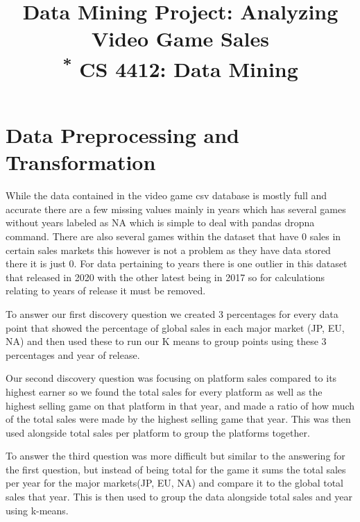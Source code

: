 \documentclass[conference]{IEEEtran}
\begin{document}
\title{Data Mining Project: Analyzing Video Game Sales\\
{\footnotesize \textsuperscript{*} CS 4412: Data Mining}

}

\author{

}
\maketitle
\section{Data Preprocessing and Transformation}
While the data contained in the video game csv database is mostly full and accurate there are a few missing values mainly in years which has several games without years labeled as NA which is simple to deal with pandas dropna command. There are also several games within the dataset that have 0 sales in certain sales markets this however is not a problem as they have data stored there it is just 0. For data pertaining to years there is one outlier in this dataset that released in 2020 with the other latest being in 2017 so for calculations relating to years of release it must be removed. 

To answer our first discovery question we created 3 percentages for every data point that showed the percentage of global sales in each major market (JP, EU, NA) and then used these to run our K means to group points using these 3 percentages and year of release.

Our second discovery question was focusing on platform sales compared to its highest earner so we found the total sales for every platform as well as the highest selling game on that platform in that year, and made a ratio of how much of the total sales were made by the highest selling game that year. This was then used alongside total sales per platform to group the platforms together. 

To answer the third question was more difficult but similar to the answering for the first question, but instead of being total for the game it sums the total sales per year for the major markets(JP, EU, NA) and compare it to the global total sales that year. This is then used to group the data alongside total sales and year using k-means.
\end{document}
